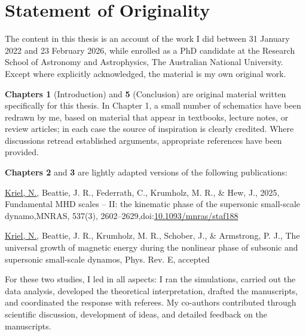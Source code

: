 \documentclass[12pt,twoside]{extreport}
\begin{document}
    \chapter*{Statement of Originality}
\vspace{-0.5cm}

The content in this thesis is an account of the work I did between 31 January 2022 and 23 February 2026, while enrolled as a PhD candidate at the Research School of Astronomy and Astrophysics, The Australian National University. Except where explicitly acknowledged, the material is my own original work.

\textbf{Chapters 1} (Introduction) and \textbf{5} (Conclusion) are original material written specifically for this thesis. In Chapter 1, a small number of schematics have been redrawn by me, based on material that appear in textbooks, lecture notes, or review articles; in each case the source of inspiration is clearly credited. Where discussions retread established arguments, appropriate references have been provided.

\textbf{Chapters 2} and \textbf{3} are lightly adapted versions of the following publications:
\begin{description}
    \item \underline{{Kriel, N.}}, Beattie, J. R., Federrath, C., Krumholz, M. R., \& Hew, J., 2025, Fundamental MHD scales -- II: the kinematic phase of the supersonic small-scale dynamo,MNRAS, 537(3), 2602–2629,doi:\href{https://doi.org/10.1093/mnras/staf188}{10.1093/mnras/staf188}

    \item \underline{{Kriel, N.}}, Beattie, J. R., Krumholz, M. R., Schober, J., \& Armstrong, P. J., The universal growth of magnetic energy during the nonlinear phase of subsonic and supersonic small-scale dynamos, Phys. Rev. E, accepted
\end{description}
For these two studies, I led in all aspects: I ran the simulations, carried out the data analysis, developed the theoretical interpretation, drafted the manuscripts, and coordinated the response with referees. My co-authors contributed through scientific discussion, development of ideas, and detailed feedback on the manuscripts.
\end{document}
